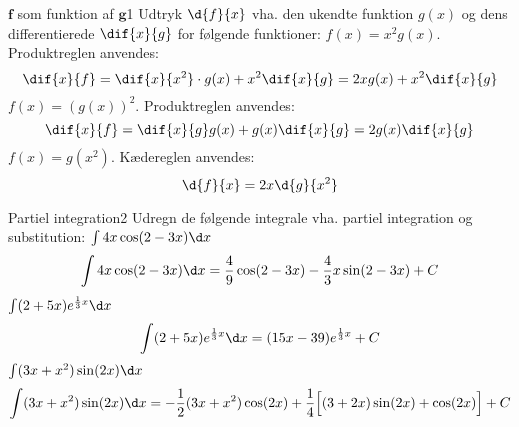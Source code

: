\begin{opgave}{$\boldsymbol{f}$ som funktion af $\boldsymbol{g}$}{1}
Udtryk $\d{f}{x}$ vha. den ukendte funktion $g(x)$ og dens
differentierede $\dif{x}{g}$ for følgende funktioner:
\opg $f(x) = x^2 g(x)$. Produktreglen anvendes:
\begin{equation*}
\dif{x}{f} = \dif{x}{x^2}\cdot g(x) + x^2\dif{x}{g} = 2xg(x)+x^2 \dif{x}{g}
\end{equation*}
\opg $f(x) = \left(g(x)\right)^2$. Produktreglen anvendes:
\begin{equation*}
\dif{x}{f} = \dif{x}{g} g(x) + g(x)\dif{x}{g} = 2g(x)\dif{x}{g}
\end{equation*}
\opg $f(x) = g(x^2)$. Kædereglen anvendes:
\begin{equation*}
\d{f}{x}=2x\d{g}{x^2}
\end{equation*}
\end{opgave}

\begin{opgave}{Partiel integration}{2}
Udregn de følgende integrale vha. partiel integration og substitution:
\opg $\int 4x\cos(2-3x)\d x$
\begin{align*}
	\int 4x\cos(2-3x)\d x = \frac{4}{9}\cos(2-3x)-\frac{4}{3}x\sin(2-3x) +C
\end{align*}
\opg $\int (2+5x)e^{\frac{1}{3}x}\d x$
\begin{align*}
	\int (2+5x)e^{\frac{1}{3}x}\d x = (15x-39)e^{\frac{1}{3}x}+C
\end{align*}
\opg $\int (3x+x^2)\sin (2x) \d x$
\begin{align*}
	\int (3x+x^2)\sin (2x) \d x = -\frac{1}{2}(3x+x^2)\cos (2x) +\frac{1}{4}\Big[ (3+2x)\sin (2x) + \cos (2x) \Big] + C
\end{align*}
\end{opgave}


